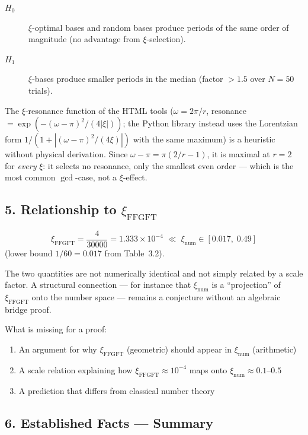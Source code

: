 \begin{description}
\item[$H_0$] $\xi$-optimal bases and random bases produce periods of the same
order of magnitude (no advantage from $\xi$-selection).
\item[$H_1$] $\xi$-bases produce smaller periods in the median (factor $> 1.5$
over $N = 50$ trials).
\end{description}

\begin{mdframed}[style=warn]
The $\xi$-resonance function of the HTML tools
($\omega = 2\pi/r$, resonance $= \exp(-(\omega - \pi)^2 / (4|\xi|))$;
the Python library instead uses the Lorentzian form
$1/(1 + |(\omega-\pi)^2/(4\xi)|)$ with the same maximum)
is a heuristic without physical derivation. Since
$\omega - \pi = \pi(2/r - 1)$, it is maximal at $r = 2$ for \emph{every} $\xi$:
it selects no resonance, only the smallest even order
— which is the most common $\gcd$-case, not a $\xi$-effect.
\end{mdframed}

\subsection*{5. Relationship to $\xi_\text{FFGFT}$}

\[
\xi_\text{FFGFT} = \frac{4}{30000} = 1.333 \times 10^{-4}
\;\ll\; \xi_\text{num} \in [0.017,\; 0.49]
\]
(lower bound $1/60 = 0.017$ from Table~3.2).

The two quantities are not numerically identical and not simply related by
a scale factor. A structural connection — for instance that $\xi_\text{num}$
is a ``projection'' of $\xi_\text{FFGFT}$ onto the number space — remains a
conjecture without an algebraic bridge proof.

What is missing for a proof:
\begin{enumerate}
\item An argument for why $\xi_\text{FFGFT}$ (geometric) should appear in
$\xi_\text{num}$ (arithmetic)
\item A scale relation explaining how $\xi_\text{FFGFT} \approx 10^{-4}$
maps onto $\xi_\text{num} \approx 0.1\text{--}0.5$
\item A prediction that differs from classical number theory
\end{enumerate}

\subsection*{6. Established Facts — Summary}

